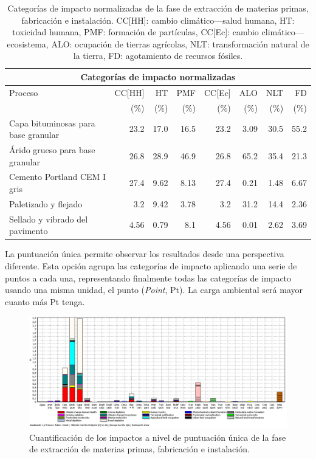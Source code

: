 \begin{table}[!htb]
\centering
\begin{tabular}{p{4cm}rrrrrrr}
\toprule
\multicolumn{8}{c}{Categorías de impacto normalizadas}\\
\midrule
Proceso & CC[HH] & HT & PMF & CC[Ec] & ALO & NLT & FD\\
 &  (\%) & (\%) & (\%) & (\%) & (\%) & (\%) & (\%)\\
\midrule
Capa bituminosas para base granular & 23.2 & 17.0 & 16.5 & 23.2 & 3.09 & 30.5 & 55.2\\
Árido grueso para base granular & 26.8 & 28.9 & 46.9 & 26.8 & 65.2 & 35.4 & 21.3\\
Cemento Portland CEM I gris & 27.4 & 9.62 & 8.13 & 27.4 & 0.21 & 1.48 & 6.67\\
Paletizado y flejado & 3.2 & 9.42 & 3.78 & 3.2 & 31.2 & 14.4 & 2.36\\
Sellado y vibrado del pavimento & 4.56 & 0.79 & 8.1 & 4.56 & 0.01 & 2.62 & 3.69\\
\bottomrule
\end{tabular}
\caption[Categorías de impacto normalizadas de la fase de extracción de materias primas, fabricación e instalación.]{Categorías de impacto normalizadas de la fase de extracción de materias primas, fabricación e instalación. CC[HH]: cambio climático—salud humana, HT: toxicidad humana, PMF: formación de partículas, CC[Ec]: cambio climático—ecosistema, ALO: ocupación de tierras agrícolas, NLT: transformación natural de la tierra, FD: agotamiento de recursos fósiles.}
\label{categoriasimpactofabricacion}
\end{table}

La puntuación única permite observar los resultados desde una perspectiva diferente. Esta opción agrupa las categorías de impacto aplicando una serie de puntos a cada una, representando finalmente todas las categorías de impacto usando una misma unidad, el punto (\textit{Point}, Pt). La carga ambiental será mayor cuanto más Pt tenga.

\begin{figure}[!htb]
\centering
\includegraphics[width=15cm]{img/fabric_puntuacionunica.png}
\caption{Cuantificación de los impactos a nivel de puntuación única de la fase de extracción de materias primas, fabricación e instalación.}
\label{fig:fabric_puntuacionunica}
\end{figure}

